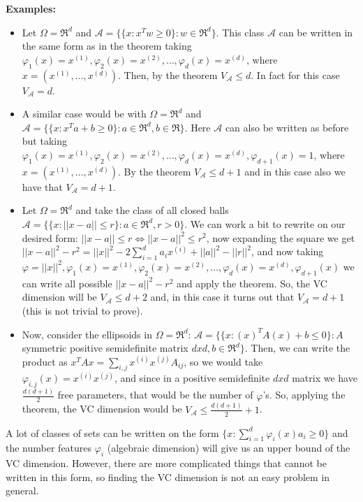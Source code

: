 \documentclass[11pt, english]{article}
\newcommand{\su}[2]{\sum\limits_{#1}^{#2}}
\begin{document}
\textbf{Examples:}
\begin{itemize}
	\item Let $\Omega=\Re^d$ and $\mathcal{A}=\{\{x:x^Tw\geq 0\}:w\in\Re^d\}$. This class $\mathcal{A}$ can be written in the same form as in the theorem taking $\varphi_1(x)=x^{(1)},\varphi_2(x)=x^{(2)},\dots,\varphi_d(x)=x^{(d)}$, where $x=(x^{(1)},\dots,x^{(d)})$. Then, by the theorem $V_{\mathcal{A}}\leq d$. In fact for this case $V_{\mathcal{A}}=d$.
	\item A similar case would be with $\Omega=\Re^d$ and $\mathcal{A}=\{\{x:x^Ta+b\geq 0\}:a\in\Re^d,b\in\Re\}$. Here $\mathcal{A}$ can also be written as before but taking $\varphi_1(x)=x^{(1)},\varphi_2(x)=x^{(2)},\dots,\varphi_d(x)=x^{(d)},\varphi_{d+1}(x)=1$, where $x=(x^{(1)},\dots,x^{(d)})$. By the theorem $V_{\mathcal{A}}\leq d+1$ and in this case also we have that $V_{\mathcal{A}}=d+1$.
	\item Let $\Omega=\Re^d$ and take the class of all closed balls $\mathcal{A}=\{\{x:||x-a||\leq r\}:a\in\Re^d,r>0 \}$. We can work a bit to rewrite on our desired form: $||x-a||\leq r\Leftrightarrow ||x-a||^2\leq r^2$, now expanding the square we get $||x-a||^2-r^2=||x||^2-2\su{i=1}{d}a_ix^{(i)}+||a||^2-||r||^2$, and now taking $\varphi=||x||^2,\varphi_1(x)=x^{(1)},\varphi_2(x)=x^{(2)},\dots,\varphi_d(x)=x^{(d)},\varphi_{d+1}(x)$ we can write all possible $||x-a||^2-r^2$ and apply the theorem. So, the VC dimension will be $V_{\mathcal{A}}\leq d+2$ and, in this case it turns out that $V_{\mathcal{A}}=d+1$ (this is not trivial to prove).
	\item Now, consider the ellipsoids in $\Omega=\Re^d$: $\mathcal{A}=\{\{x:(x)^TA(x)+b\leq 0\}:A$ symmetric positive semidefinite matrix $dxd,b\in\Re^d\}$. Then, we can write the product as $x^TAx=\su{i,j}{}x^{(i)}x^{(j)}A_{ij}$, so we would take $\varphi_{i,j}(x)=x^{(i)}x^{(j)}$, and since in a positive semidefinite $dxd$ matrix we have $\frac{d(d+1)}{2}$ free parameters, that would be the number of $\varphi$'s. So, applying the theorem, the VC dimension would be $V_{\mathcal{A}}\leq\frac{d(d+1)}{2}+1$.%

\end{itemize}
A lot of classes of sets can be written on the form $\{x:\su{i=1}{d}\varphi_i(x)a_i\geq 0\}$ and the number features $\varphi_i$ (algebraic dimension) will give us an upper bound of the VC dimension. However, there are more complicated things that cannot be written in this form, so finding the VC dimension is not an easy problem in general.\\
\end{document}
